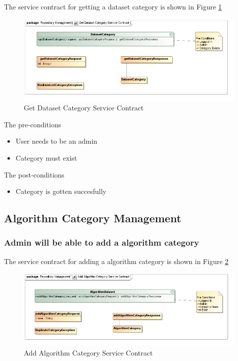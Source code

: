 The service contract for getting a dataset category is shown in Figure \ref{fig:getDatasetCatService}
\begin{figure}[H]
  \begin{center}
  \includegraphics[scale=0.6]{../Diagrams and Charts/Test Data/Get Dataset Category Service Contract.jpg}
  \caption{Get Dataset Category Service Contract}
  \end{center}
  \label{fig:getDatasetCatService}
\end{figure}

The pre-conditions
\begin{itemize}
  \item User needs to be an admin
  \item Category must exist
\end{itemize}

The post-conditions
\begin{itemize}
  \item Category is gotten succesfully
\end{itemize}

\subsection{Algorithm Category Management}

\subsubsection {Admin will be able to add a algorithm category}
The service contract for adding a algorithm category is shown in Figure \ref{fig:addAlgorithmCatService}
\begin{figure}[H]
  \begin{center}
  \includegraphics[scale=0.6]{../Diagrams and Charts/Test Data/Add Algorithm Category Service Contract.jpg}
  \caption{Add Algorithm Category Service Contract}
  \end{center}
  \label{fig:addAlgorithmCatService}
\end{figure}

